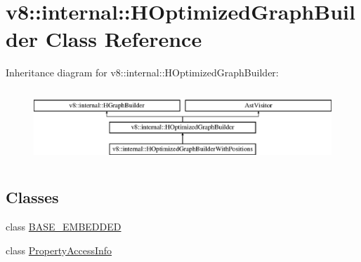 \hypertarget{classv8_1_1internal_1_1_h_optimized_graph_builder}{}\section{v8\+:\+:internal\+:\+:H\+Optimized\+Graph\+Builder Class Reference}
\label{classv8_1_1internal_1_1_h_optimized_graph_builder}
Inheritance diagram for v8\+:\+:internal\+:\+:H\+Optimized\+Graph\+Builder\+:\begin{figure}[H]
\begin{center}
\leavevmode
\includegraphics[height=2.790698cm]{classv8_1_1internal_1_1_h_optimized_graph_builder}
\end{center}
\end{figure}
\subsection*{Classes}
\begin{DoxyCompactItemize}
\item 
class \hyperlink{classv8_1_1internal_1_1_h_optimized_graph_builder_1_1_b_a_s_e___e_m_b_e_d_d_e_d}{B\+A\+S\+E\+\_\+\+E\+M\+B\+E\+D\+D\+ED}
\item 
class \hyperlink{classv8_1_1internal_1_1_h_optimized_graph_builder_1_1_property_access_info}{Property\+Access\+Info}
\end{DoxyCompactItemize}
